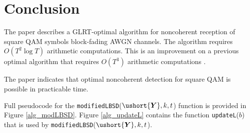 \documentclass[conference]{IEEEtran}
\newcommand{\uY}{\ushort{\bm{Y}}}
\begin{document}
\section{Conclusion}

The paper describes a GLRT-optimal algorithm for noncoherent reception of square QAM symbols block-fading AWGN channels.  The algorithm requires $O(T^2\log{T})$ arithmetic computations.  This is an improvement on a previous optimal algorithm that requires $O(T^3)$ arithmetic computations \cite{Ryan2007}.

The paper indicates that optimal noncoherent detection for square QAM is possible in practicable time.


\small


\appendix
{\normalsize
Full pseudocode for the \texttt{modifiedLBSD}($\uY, k,t$) function is provided in Figure \ref{alg_modLBSD}.  Figure \ref{alg_updateL} contains the function \texttt{updateL}($b$) that is used by \texttt{modifiedLBSD}($\uY,k,t$).}
\end{document}
